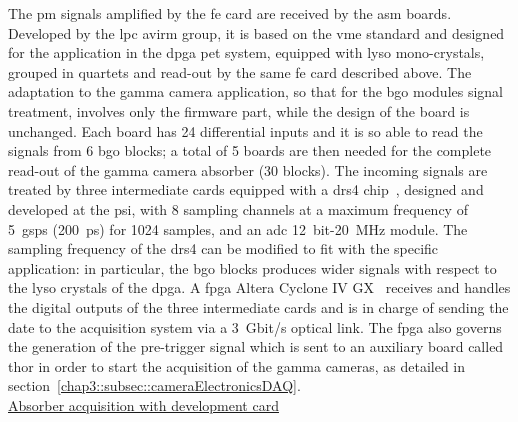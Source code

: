 The \gls{pm} signals amplified by the \gls{fe} card are received by the \gls{asm} boards. Developed by the \gls{lpc} \gls{avirm} group, it is based on the \gls{vme} standard and designed for the application in the \gls{dpga} \gls{pet} system, equipped with \gls{lyso} mono-crystals, grouped in quartets and read-out by the same \gls{fe} card described above. The adaptation to the gamma camera application, so that for the \gls{bgo} modules signal treatment, involves only the firmware part, while the design of the board is unchanged. Each board has 24 differential inputs and it is so able to read the signals from 6 \gls{bgo} blocks; a total of 5 boards are then needed for the complete read-out of the gamma camera absorber (30 blocks). The incoming signals are treated by three intermediate cards  equipped with a \gls{drs}4 chip~\parencite{Ritt2009}, designed and developed at the \gls{psi}, with 8 sampling channels at a maximum frequency of 5~\gls{gsps} (200~ps) for 1024 samples, and an \gls{adc} 12~bit-20~MHz module. The sampling frequency of the \gls{drs}4 can be modified to fit with the specific application: in particular, the \gls{bgo} blocks produces wider signals with respect to the \gls{lyso} crystals of the \gls{dpga}. A \gls{fpga} Altera Cyclone IV GX~\parencite{Altera2016} receives and handles the digital outputs of the three intermediate cards and is in charge of sending the date to the acquisition system via a 3~Gbit/s optical link. The \gls{fpga} also governs the generation of the pre-trigger signal which is sent to an auxiliary board called \gls{thor} in order to start the acquisition of the gamma cameras, as detailed in section~\ref{chap3::subsec::cameraElectronicsDAQ}.\\

\underline{Absorber acquisition with development card} \\

